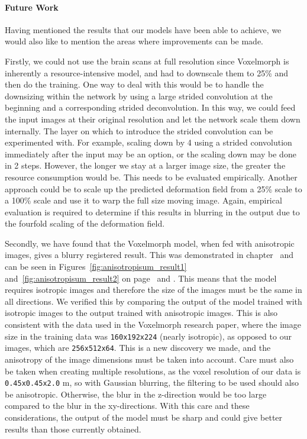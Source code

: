 \documentclass{book}
\begin{document}
	\paragraph{Future Work}
	Having mentioned the results that our models have been able to achieve, we would also like to mention the areas where improvements can be made.
	
	Firstly, we could not use the brain scans at full resolution since Voxelmorph is inherently a resource-intensive model, and had to downscale them to 25\% and then do the training. One way to deal with this would be to handle the downsizing within the network by using a large strided convolution at the beginning and a corresponding strided deconvolution. In this way, we could feed the input images at their original resolution and let the network scale them down internally. The layer on which to introduce the strided convolution can be experimented with. For example, scaling down by 4 using a strided convolution immediately after the input may be an option, or the scaling down may be done in 2 steps. However, the longer we stay at a larger image size, the greater the resource consumption would be. This needs to be evaluated empirically. Another approach could be to scale up the predicted deformation field from a 25\% scale to a 100\% scale and use it to warp the full size moving image. Again, empirical evaluation is required to determine if this results in blurring in the output due to the fourfold scaling of the deformation field.
	
	Secondly, we have found that the Voxelmorph model, when fed with anisotropic images, gives a blurry registered result. This was demonstrated in chapter~ and can be seen in Figures~\ref{fig:anisotropisum_result1} and~\ref{fig:anisotropisum_result2} on page~\pageref{fig:anisotropisum_result1} and \pageref{fig:anisotropisum_result2}. This means that the model requires isotropic images and therefore the size of the images must be the same in all directions. We verified this by comparing the output of the model trained with isotropic images to the output trained with anisotropic images. This is also consistent with the data used in the Voxelmorph research paper, where the image size in the training data was \texttt{160x192x224} (nearly isotropic), as opposed to our images, which are \texttt{256x512x64}. This is a new discovery we made, and the anisotropy of the image dimensions must be taken into account. Care must also be taken when creating multiple resolutions, as the voxel resolution of our data is \texttt{0.45x0.45x2.0} \textmu m, so with Gaussian blurring, the filtering to be used should also be anisotropic. Otherwise, the blur in the z-direction would be too large compared to the blur in the xy-directions. With this care and these considerations, the output of the model must be sharp and could give better results than those currently obtained.
	
	\newpage
	\listoffigures %
	\listoftables
	\lstlistoflistings %
	
	\begin{appendix}
		
		\cleardoublepage
	\end{appendix}
	
	
	
\end{document}
